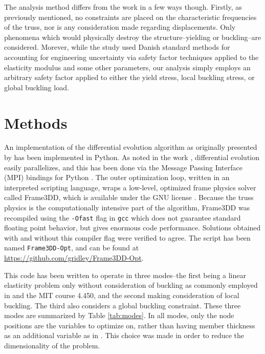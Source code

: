 \documentclass{report}
\begin{document}
The analysis method differs from the work \cite{pedersenOptimizationPracticalTrusses2003} in
a few ways though. Firstly, as previously mentioned, no constraints are placed on the characteristic
frequencies of the truss, nor is any consideration made regarding displacements. Only
phenomena which would physically destroy the structure--yielding or buckling--are considered.
Morever, while the study \cite{pedersenOptimizationPracticalTrusses2003} used Danish standard
methods for accounting for engineering uncertainty via safety factor techniques applied to
the elasticity modulus and some other parameters, our analysis simply employs an arbitrary
safety factor applied to either the yield stress, local buckling stress, or global buckling
load.

\section{Methods}

An implementation of the differential evolution algorithm as originally presented by \cite{stornDifferentialEvolutionSimple1997}
has been implemented in Python. As noted in the work \cite{stornDifferentialEvolutionSimple1997}, differential evolution
easily parallelizes, and this has been done via the Message Passing Interface (MPI) \cite{groppUsingMPI2nd1999} bindings
for Python \cite{dalcinParallelDistributedComputing2011}. The outer optimization loop, written in an interpreted scripting
language, wraps a low-level, optimized frame physics solver called Frame3DD, which is available under the GNU license \cite{gavinUserManualReference}.
Because the truss physics is the computationally intensive part of the algorithm, Frame3DD was recompiled using the \texttt{-Ofast}
flag in \texttt{gcc} \cite{stallmanUsingGnuCompiler2009} which does not guarantee standard floating point behavior, but
gives enormous code performance. Solutions obtained with and without this compiler flag were verified to agree. The script
has been named \texttt{Frame3DD-Opt}, and can be found at \url{https://github.com/gridley/Frame3DD-Opt}.

This code has been written to operate in three modes--the first being a linear elasticity problem only without consideration
of buckling as commonly employed in \cite{muellerComputationalExplorationStructural2014} and the MIT course 4.450, and
the second making consideration of local buckling. The third also considers a global buckling constraint.
These three modes are summarized by Table \ref{tab:modes}.
In all modes, only the node positions are the variables
to optimize on, rather than having member thickness as an additional variable as in \cite{pedersenOptimizationPracticalTrusses2003}.
This choice was made in order to reduce the dimensionality of the problem.
\end{document}
